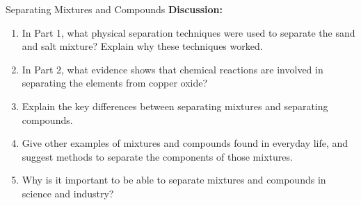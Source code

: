 \begin{investigation}{Separating Mixtures and Compounds}
\textbf{Discussion:}
\begin{enumerate}
    \item In Part 1, what physical separation techniques were used to separate the sand and salt mixture? Explain why these techniques worked.
    \item In Part 2, what evidence shows that chemical reactions are involved in separating the elements from copper oxide?
    \item Explain the key differences between separating mixtures and separating compounds.
    \item Give other examples of mixtures and compounds found in everyday life, and suggest methods to separate the components of those mixtures.
    \item Why is it important to be able to separate mixtures and compounds in science and industry?
\end{enumerate}
\end{investigation}


